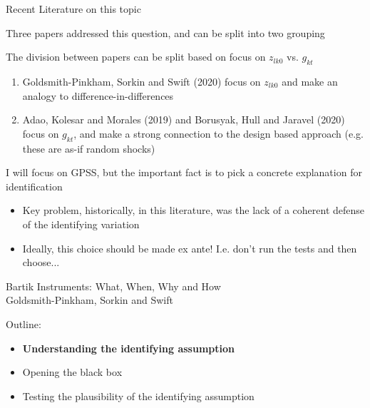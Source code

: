 \documentclass[notes,11pt, aspectratio=169]{beamer}
\newenvironment{wideitemize}{\itemize\addtolength{\itemsep}{10pt}}{\enditemize}
\begin{document}
\begin{frame}{Recent Literature on this topic}
  \begin{wideitemize}
  \item Three papers addressed this question, and can be split into two grouping
  \item The division between papers can be split based on focus on $z_{lk0}$ vs. $g_{kt}$
    \begin{enumerate}
    \item Goldsmith-Pinkham, Sorkin and Swift (2020) focus on $z_{lk0}$ and make an analogy to difference-in-differences
    \item Adao, Kolesar and Morales (2019) and Borusyak, Hull and Jaravel (2020) focus on $g_{kt}$, and make a strong connection to the design based approach (e.g. these are as-if random shocks)
    \end{enumerate}
  \item I will focus on GPSS, but the important fact is to pick a concrete explanation for identification
    \begin{itemize}
    \item Key problem, historically, in this literature, was the lack
      of a coherent defense of the identifying variation
    \item Ideally, this choice should be made ex ante! I.e. don't run the tests and then choose...
    \end{itemize}
  \end{wideitemize}
\end{frame}




\begin{frame}
{  \Large
  \begin{center}
    Bartik Instruments: What, When, Why and How\\
    Goldsmith-Pinkham, Sorkin and Swift
  \end{center}
}
  \addtocounter{framenumber}{-1}

Outline:
\begin{itemize}
\setlength\itemsep{1em}
\item \textbf{Understanding the identifying assumption}
\item Opening the black box
\item Testing the plausibility of the identifying assumption
\end{itemize}

\end{frame}
\end{document}
